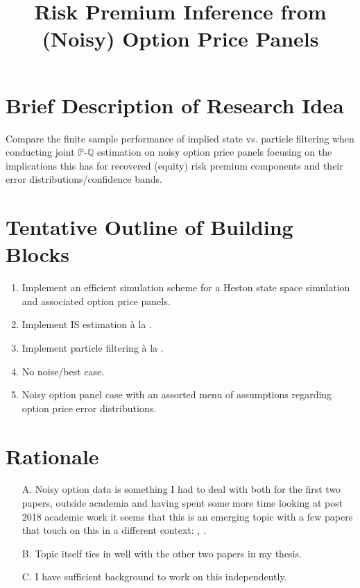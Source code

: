 \documentclass[11pt,a4paper,notitlepage]{article}
\author{ %
	    }
\title{\vspace*{-55pt} Risk Premium Inference from (Noisy) Option Price Panels \vspace*{-35pt}}
\date{\item First version: June 16, 2018 \item Previous Version : February 21, 2024 \item This version: \today}
\numberwithin{equation}{section}
\begin{document}
\maketitle

\onehalfspacing

\section*{Brief Description of Research Idea}
Compare the finite sample performance of implied state vs. particle filtering when conducting joint $\mathbb{P}$-$\mathbb{Q}$	estimation on noisy option price panels focusing on the implications this has for recovered (equity) risk premium components and their error distributions/confidence bands. 

\section*{Tentative Outline of Building Blocks}
\begin{enumerate}
\item Implement an efficient simulation scheme for a Heston \citep{heston} state space simulation and associated option price panels.
\item Implement IS estimation \`{a} la \cite{boswijk2015asset}.
\item Implement particle filtering \`{a} la \cite{hurn2015pf}.
\item No noise/best case.
\item Noisy option panel case with an assorted menu of assumptions regarding option price error distributions.
\end{enumerate}

\section*{Rationale}
\begin{enumerate}
\item[A.] Noisy option data is something I had to deal with both for the first two papers, outside academia and having spent some more time looking at post 2018 academic work it seems that this is an emerging topic with a few papers that touch on this in a different context: \cite{andersen2021spatial}, \cite{duarte2019very}.
\item[B.] Topic itself ties in well with the other two papers in my thesis.
\item[C.] I have sufficient background to work on this independently.
\end{enumerate}
\end{document}
